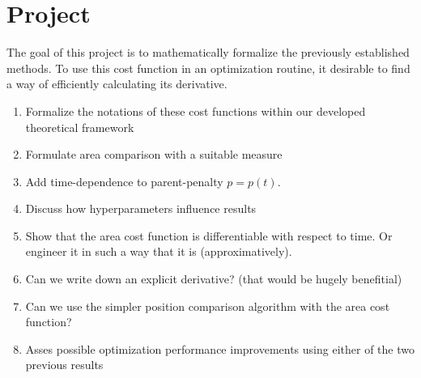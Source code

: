 \documentclass[twocolumn]{article}
\begin{document}
\section{Project}
The goal of this project is to mathematically formalize the previously established methods.
To use this cost function in an optimization routine, it desirable to find a way of efficiently
calculating its derivative.
\begin{enumerate}[noitemsep]
    \item Formalize the notations of these cost functions within our developed theoretical framework
    \item Formulate area comparison with a suitable measure
    \item Add time-dependence to parent-penalty $p=p(t)$.
    \item Discuss how hyperparameters influence results
    \item Show that the area cost function is differentiable with respect to time.
        Or engineer it in such a way that it is (approximatively).
    \item Can we write down an explicit derivative? (that would be hugely benefitial)
    \item Can we use the simpler position comparison algorithm with the area cost function?
    \item Asses possible optimization performance improvements using either of the two previous results
\end{enumerate}



\end{document}
